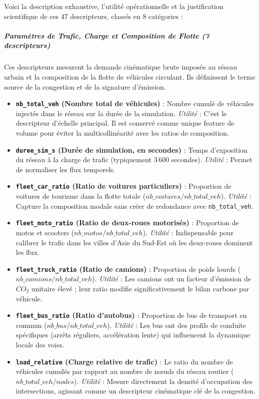 \documentclass[10pt, a4paper]{article}
\providecommand{\tightlist}{}
\begin{document}
Voici la description exhaustive, l'utilité opérationnelle et la
justification scientifique de ces 47 descripteurs, classés en 8
catégories :

\subparagraph{Paramètres de Trafic, Charge et Composition de Flotte (7
descripteurs)}\label{paramuxe8tres-de-trafic-charge-et-composition-de-flotte-7-descripteurs}

Ces descripteurs mesurent la demande cinématique brute imposée au réseau
urbain et la composition de la flotte de véhicules circulant. Ils
définissent le terme source de la congestion et de la signature
d'émission.

\begin{itemize}
\tightlist
\item
  \textbf{\texttt{nb\_total\_veh} (Nombre total de véhicules)} : Nombre
  cumulé de véhicules injectés dans le réseau sur la durée de la
  simulation. \emph{Utilité} : C'est le descripteur d'échelle principal.
  Il est conservé comme unique feature de volume pour éviter la
  multicollinéarité avec les ratios de composition.
\item
  \textbf{\texttt{duree\_sim\_s} (Durée de simulation, en secondes)} :
  Temps d'exposition du réseau à la charge de trafic (typiquement 3\,600
  secondes). \emph{Utilité} : Permet de normaliser les flux temporels.
\item
  \textbf{\texttt{fleet\_car\_ratio} (Ratio de voitures particuliers)} :
  Proportion de voitures de tourisme dans la flotte totale
  (\(nb\_voitures / nb\_total\_veh\)). \emph{Utilité} : Capture la
  composition modale sans créer de redondance avec
  \texttt{nb\_total\_veh}.
\item
  \textbf{\texttt{fleet\_moto\_ratio} (Ratio de deux-roues motorisés)} :
  Proportion de motos et scooters (\(nb\_motos / nb\_total\_veh\)).
  \emph{Utilité} : Indispensable pour calibrer le trafic dans les villes
  d'Asie du Sud-Est où les deux-roues dominent les flux.
\item
  \textbf{\texttt{fleet\_truck\_ratio} (Ratio de camions)} : Proportion
  de poids lourds (\(nb\_camions / nb\_total\_veh\)). \emph{Utilité} :
  Les camions ont un facteur d'émission de \(CO_2\) unitaire élevé ;
  leur ratio modifie significativement le bilan carbone par véhicule.
\item
  \textbf{\texttt{fleet\_bus\_ratio} (Ratio d'autobus)} : Proportion de
  bus de transport en commun (\(nb\_bus / nb\_total\_veh\)).
  \emph{Utilité} : Les bus ont des profils de conduite spécifiques
  (arrêts réguliers, accélération lente) qui influencent la dynamique
  locale des voies.
\item
  \textbf{\texttt{load\_relative} (Charge relative de trafic)} : Le
  ratio du nombre de véhicules cumulés par rapport au nombre de nœuds du
  réseau routier (\(nb\_total\_veh / nodes\)). \emph{Utilité} : Mesure
  directement la densité d'occupation des intersections, agissant comme
  un descripteur cinématique clé de la congestion.
\end{itemize}
\end{document}
